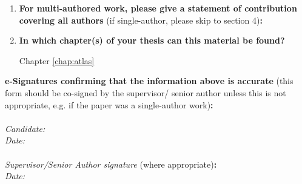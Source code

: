 {\begin{enumerate}[leftmargin=*,label={\bfseries\arabic*.}]
\begin{enumerate}[label={\alph*)}]
	Proceedings of the 
	\item \textbf{List the manuscript's authors in the intended authorship order:}

	\citeauthor*{Young2023}
	\item \textbf{Stage of publication:}

	Work presented at conference, copyright transferred to IEEE, yet now indication of if/when proceedings may be published (copyright on submitted version retained).
\end{enumerate}

\item \textbf{For multi-authored work, please give a statement of contribution covering all authors} (if single-author, please skip to section 4)\textbf{:}
\item \textbf{In which chapter(s) of your thesis can this material be found?}

Chapter \ref{chap:atlas}
\end{enumerate}

\textbf{e-Signatures confirming that the information above is accurate}
(this form should be co-signed by the supervisor/ senior author unless this is not appropriate, e.g. if the paper was a single-author work)\textbf{:}\\
\\[\baselineskip]
\textit{Candidate:}
\\[\baselineskip]
\textit{Date:}\\\signdate
\\[\baselineskip]
\textit{Supervisor/Senior Author signature} (where appropriate)\textbf{:}
\\[\baselineskip]
\textit{Date:}\\\signdate
%

}
